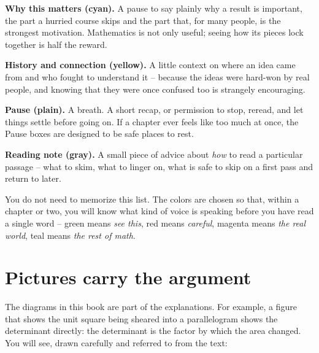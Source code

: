 \begin{aestheticbox}
\textbf{Why this matters (cyan).} A pause to say plainly why a result is important,
the part a hurried course skips and the part that, for many people, is the
strongest motivation. Mathematics is not only useful;
seeing how its pieces lock together is half the reward.
\end{aestheticbox}

\begin{historybox}
\textbf{History and connection (yellow).} A little context on where an idea came
from and who fought to understand it -- because the ideas were hard-won by real
people, and knowing that they were once confused too is strangely encouraging.
\end{historybox}

\begin{recoverybox}
\textbf{Pause (plain).} A breath. A short recap, or permission to stop, reread,
and let things settle before going on. If a chapter ever feels like too much at
once, the Pause boxes are designed to be safe places to rest.
\end{recoverybox}

\begin{marginnotebox}
\textbf{Reading note (gray).} A small piece of advice about \emph{how} to read a
particular passage -- what to skim, what to linger on, what is safe to skip on a
first pass and return to later.
\end{marginnotebox}

\begin{focusbox}
You do not need to memorize this list. The colors are chosen so that, within a
chapter or two, you will know what kind of voice is speaking before you have read
a single word -- green means \emph{see this}, red means \emph{careful}, magenta
means \emph{the real world}, teal means \emph{the rest of math}.
\end{focusbox}

\section*{Pictures carry the argument}

The diagrams in this book are part of the explanations. For example, a figure that
shows the unit square being sheared into a parallelogram shows the determinant
directly: the determinant is the factor by which the area changed.
You will see, drawn carefully and referred to from the text:


